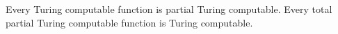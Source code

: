 Every Turing computable function is partial Turing computable. Every total partial Turing computable function is Turing computable.
